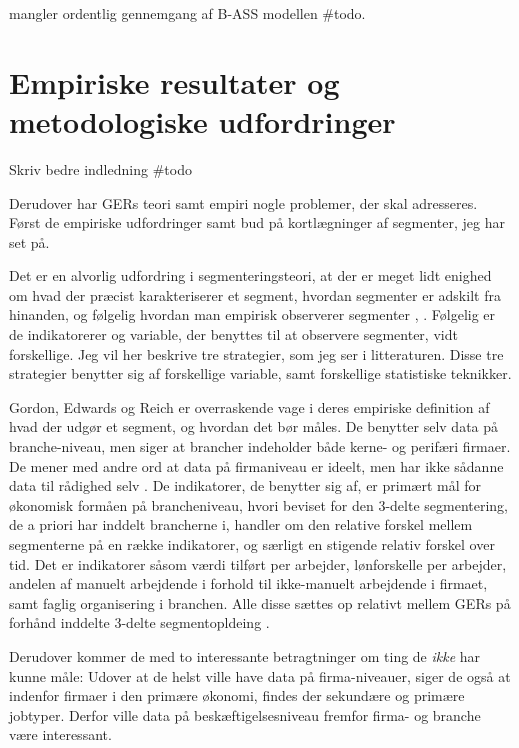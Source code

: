 mangler ordentlig gennemgang af B-ASS modellen \#todo.


\chapter{Empiriske resultater og metodologiske udfordringer  \label{teori_AST_metodeogempiri}}


Skriv bedre indledning \#todo

Derudover har GERs teori samt empiri nogle problemer, der skal adresseres. Først de empiriske udfordringer samt bud på kortlægninger af segmenter, jeg har set på.

Det er en alvorlig udfordring i segmenteringsteori, at der er meget lidt enighed om hvad der præcist karakteriserer et segment, hvordan segmenter er adskilt fra hinanden, og følgelig hvordan man empirisk observerer segmenter \parencite[71]{Leontaridi1998}, \parencite[1231]{Cain1976}. Følgelig er de indikatorerer og variable, der benyttes til at observere segmenter, vidt forskellige. Jeg vil her beskrive tre strategier, som jeg ser i litteraturen. Disse tre strategier benytter sig af forskellige variable, samt forskellige statistiske teknikker. 

Gordon, Edwards og Reich er overraskende vage i deres empiriske definition af hvad der udgør et segment, og hvordan det bør måles.
De benytter selv data på branche-niveau, men siger at brancher  indeholder både kerne- og perifæri firmaer. De mener med andre ord at data på firmaniveau er ideelt, men har ikke sådanne data til rådighed selv \parencite[193]{Gordon1982}. De indikatorer, de benytter sig af, er primært mål for økonomisk formåen på brancheniveau, hvori beviset for den 3-delte segmentering, de a priori har inddelt brancherne i, handler om den relative forskel mellem segmenterne på en række indikatorer, og særligt en stigende relativ forskel over tid. 
Det er indikatorer såsom værdi tilført per arbejder, lønforskelle per arbejder, andelen af manuelt arbejdende i forhold til ikke-manuelt arbejdende i firmaet, samt faglig organisering i branchen. Alle disse sættes op relativt mellem GERs på forhånd inddelte 3-delte segmentopldeing \parencite[193]{Gordon1982}. 

Derudover kommer de med to interessante betragtninger om ting de \emph{ikke} har kunne måle: Udover at de helst ville have data på firma-niveauer, siger de også at indenfor firmaer i den primære økonomi, findes der sekundære og primære jobtyper. Derfor ville data på beskæftigelsesniveau fremfor firma- og branche være interessant\parencite[193]{Gordon1982}. 



